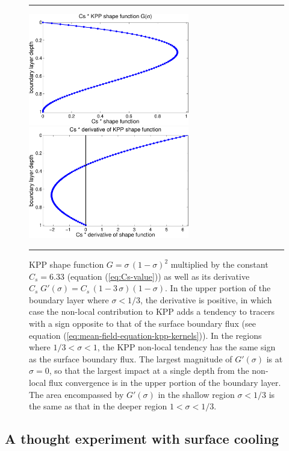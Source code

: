 \begin{figure}[h!t]
\rule{\textwidth}{0.005in}
\begin{center}
\includegraphics[angle=0,width=7cm]{./figs/KPP_Gfunction.pdf}
\includegraphics[angle=0,width=7cm]{./figs/KPP_Gprime.pdf}
\caption[KPP shape function]{\sf KPP shape function $G = \sigma \,
  (1-\sigma)^{2}$ multiplied by the constant $C_{s} = 6.33$ (equation
  (\ref{eq:Cs-value})) as well as its derivative $C_{s} \; G'(\sigma)
  = C_{s} \, (1-3\, \sigma)(1-\sigma)$. In the upper portion of the
  boundary layer where $\sigma < 1/3$, the derivative is positive, in
  which case the non-local contribution to KPP adds a tendency to
  tracers with a sign opposite to that of the surface boundary flux
  (see equation (\ref{eq:mean-field-equation-kpp-kernels})).  In the
  regions where $1/3 < \sigma < 1$, the KPP non-local tendency has the
  same sign as the surface boundary flux.  The largest magnitude of
  $G'(\sigma)$ is at $\sigma=0$, so that the largest impact at a
  single depth from the non-local flux convergence is in the upper
  portion of the boundary layer.  The area encompassed by $G'(\sigma)$
  in the shallow region $\sigma < 1/3$ is the same as that in the
  deeper region $1 < \sigma < 1/3$.}
\label{fig:KPP-shape-function}
\end{center}
\rule{\textwidth}{0.005in}
\end{figure}


\subsection{A thought experiment with surface cooling}

